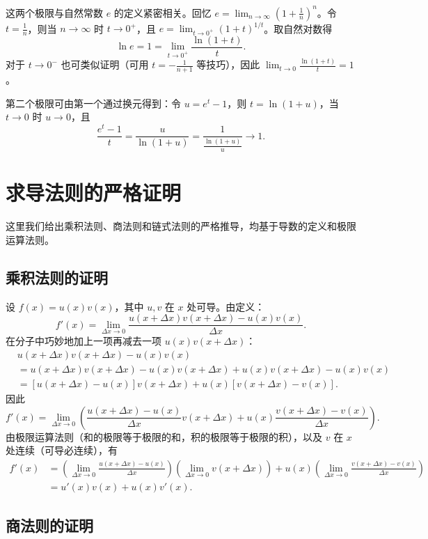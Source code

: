 \documentclass[10pt]{article}
\begin{document}
这两个极限与自然常数 $e$ 的定义紧密相关。回忆 $e = \lim_{n \to \infty} (1+\frac{1}{n})^n$。令 $t = \frac{1}{n}$，则当 $n \to \infty$ 时 $t \to 0^+$，且 $e = \lim_{t \to 0^+} (1+t)^{1/t}$。取自然对数得
$$
\ln e = 1 = \lim_{t \to 0^+} \frac{\ln(1+t)}{t}.
$$
对于 $t \to 0^-$ 也可类似证明（可用 $t = -\frac{1}{n+1}$ 等技巧），因此 $\lim_{t \to 0} \frac{\ln(1+t)}{t} = 1$。

第二个极限可由第一个通过换元得到：令 $u = e^t - 1$，则 $t = \ln(1+u)$，当 $t \to 0$ 时 $u \to 0$，且
$$
\frac{e^t - 1}{t} = \frac{u}{\ln(1+u)} = \frac{1}{\frac{\ln(1+u)}{u}} \to 1.
$$

\section{求导法则的严格证明}

这里我们给出乘积法则、商法则和链式法则的严格推导，均基于导数的定义和极限运算法则。

\subsection{乘积法则的证明}

设 $f(x) = u(x)v(x)$，其中 $u,v$ 在 $x$ 处可导。由定义：
$$
f'(x) = \lim_{\Delta x \to 0} \frac{u(x+\Delta x)v(x+\Delta x) - u(x)v(x)}{\Delta x}.
$$
在分子中巧妙地加上一项再减去一项 $u(x)v(x+\Delta x)$：
$$
\begin{aligned}
& u(x+\Delta x)v(x+\Delta x) - u(x)v(x) \\
&= u(x+\Delta x)v(x+\Delta x) - u(x)v(x+\Delta x) + u(x)v(x+\Delta x) - u(x)v(x) \\
&= [u(x+\Delta x)-u(x)]v(x+\Delta x) + u(x)[v(x+\Delta x)-v(x)].
\end{aligned}
$$
因此
$$
f'(x) = \lim_{\Delta x \to 0} \left( \frac{u(x+\Delta x)-u(x)}{\Delta x} v(x+\Delta x) + u(x) \frac{v(x+\Delta x)-v(x)}{\Delta x} \right).
$$
由极限运算法则（和的极限等于极限的和，积的极限等于极限的积），以及 $v$ 在 $x$ 处连续（可导必连续），有
$$
\begin{aligned}
f'(x) &= \left( \lim_{\Delta x \to 0} \frac{u(x+\Delta x)-u(x)}{\Delta x} \right) \left( \lim_{\Delta x \to 0} v(x+\Delta x) \right) + u(x) \left( \lim_{\Delta x \to 0} \frac{v(x+\Delta x)-v(x)}{\Delta x} \right) \\
&= u'(x) v(x) + u(x) v'(x).
\end{aligned}
$$

\subsection{商法则的证明}
\end{document}

